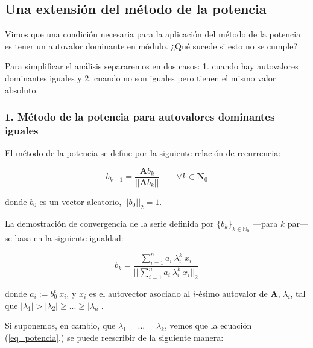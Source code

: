 
\vspace{1em}
\subsection{Una extensión del método de la potencia} \label{ap_A}

Vimos que una condición necesaria para la aplicación del método de la potencia es tener un autovalor dominante en módulo. ¿Qué sucede si esto no se cumple?

\vspace{1em}
\noindent Para simplificar el análisis separaremos en dos casos: 1. cuando hay autovalores dominantes iguales y 2. cuando no son iguales pero tienen el mismo valor absoluto.

\vspace{2em}
\subsubsection*{1. Método de la potencia para autovalores dominantes iguales} El método de la potencia se define por la siguiente relación de recurrencia:

\vspace{1em}
\begin{equation*} 
    b_{k+1} = \frac{\mathbf{A}b_k}{||\mathbf{A}b_k||} \qquad \forall k \in \mathbf{N}_0
\end{equation*}

\vspace{1em}
\noindent donde $b_0$ es un vector aleatorio, $||b_0||_2 = 1$.

\vspace{1em}
\noindent La demostración de convergencia de la serie definida por $\{b_k\}_{k \in \mathbb{N}_0}$ ---para $k$ par--- se basa en la siguiente igualdad: 

\begin{equation} \label{eq_potencia}
    b_k = \frac{\sum_{i=1}^{n} a_i \ \lambda_{i}^{k} \ x_i }{||\sum_{i=1}^{n} a_i \ \lambda_{i}^{k} \ x_i||_2}
\end{equation}

\vspace{1em}
\noindent donde $a_i := b_0^t\ x_i$, y $x_i$ es el autovector asociado al $i$-ésimo autovalor de $\mathbf{A}$, $\lambda_i$, tal que $|\lambda_1| > |\lambda_2| \geq ... \geq |\lambda_n|$.

\vspace{2em}
\noindent Si suponemos, en cambio, que $\lambda_1 = ... = \lambda_k$, vemos que la ecuación (\ref{eq_potencia}.) se puede reescribir de la siguiente manera:

